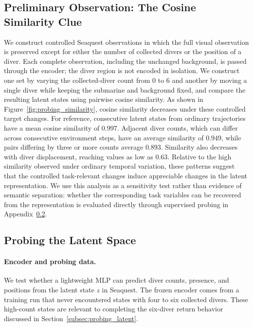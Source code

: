 \documentclass{article} %
\begin{document}
\subsection{Preliminary Observation: The Cosine Similarity Clue}
We construct controlled Seaquest observations in which the full visual observation is preserved except for either the number of collected divers or the position of a diver. Each complete observation, including the unchanged background, is passed through the encoder; the diver region is not encoded in isolation. We construct one set by varying the collected-diver count from 0 to 6 and another by moving a single diver while keeping the submarine and background fixed, and compare the resulting latent states using pairwise cosine similarity. As shown in Figure~\ref{fig:probing_similarity}, cosine similarity decreases under these controlled target changes. For reference, consecutive latent states from ordinary trajectories have a mean cosine similarity of $0.997$. Adjacent diver counts, which can differ across consecutive environment steps, have an average similarity of $0.949$, while pairs differing by three or more counts average $0.893$. Similarity also decreases with diver displacement, reaching values as low as $0.63$. Relative to the high similarity observed under ordinary temporal variation, these patterns suggest that the controlled task-relevant changes induce appreciable changes in the latent representation. We use this analysis as a sensitivity test rather than evidence of semantic separation: whether the corresponding task variables can be recovered from the representation is evaluated directly through supervised probing in Appendix~\ref{subsec:appendix_probing_latent}.

\subsection{Probing the Latent Space}
\label{subsec:appendix_probing_latent}

\paragraph{Encoder and probing data.}
We test whether a lightweight MLP can predict diver counts, presence, and positions from the latent state $z$ in Seaquest. The frozen encoder comes from a training run that never encountered states with four to six collected divers. These high-count states are relevant to completing the six-diver return behavior discussed in Section~\ref{subsec:probing_latent}.
\end{document}
